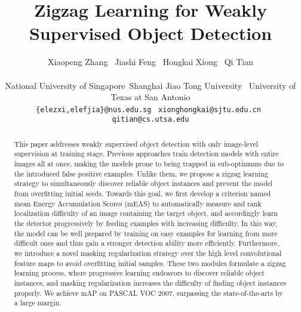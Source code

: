 \documentclass[10pt,twocolumn,letterpaper]{article}
\begin{document}
\title{Zigzag Learning for Weakly Supervised Object Detection}
\author{Xiaopeng Zhang \, Jiashi Feng \, Hongkai Xiong \, Qi Tian\\\\
 \normalsize {National University of Singapore}\,
 \normalsize {Shanghai Jiao Tong University} \,
 \normalsize {University of Texas at San Antonio}\\
{\tt\small \{elezxi,elefjia\}@nus.edu.sg} \,
{\tt\small xionghongkai@sjtu.edu.cn} \, {\tt\small qitian@cs.utsa.edu}
}

\maketitle
\thispagestyle{empty}

\begin{abstract}
This paper addresses weakly supervised object detection with only image-level supervision at training stage. Previous approaches train detection models with entire images all at once, making the models prone to being trapped in sub-optimums due to the introduced false positive examples. Unlike them, we propose a zigzag learning strategy to simultaneously discover reliable object instances and prevent the model from overfitting initial seeds. Towards this goal, we first develop a criterion named mean Energy Accumulation Scores (mEAS) to automatically measure and rank localization difficulty of an image containing the target object, and accordingly learn the detector progressively by feeding examples with increasing difficulty. In this way, the model can be well prepared by training on easy examples for learning from more difficult ones and thus gain a stronger detection ability more efficiently. Furthermore, we introduce a novel masking regularization strategy over the high level convolutional feature maps to avoid overfitting initial samples. These two modules formulate a zigzag learning process, where progressive learning endeavors to discover reliable object instances, and masking regularization increases the difficulty of finding object instances properly. We achieve  mAP on PASCAL VOC 2007, surpassing the state-of-the-arts by a large margin.
\end{abstract}
\end{document}
